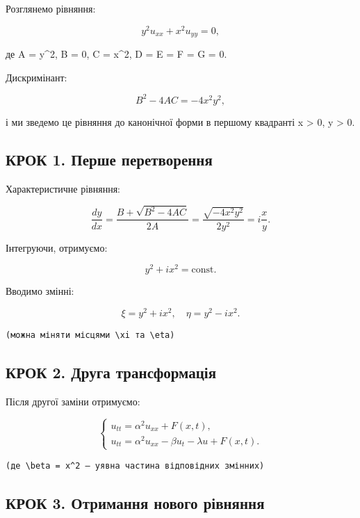 \documentclass[
  ukrainian,
]{article}
\begin{document}
Розглянемо рівняння:

\[
y^2 u_{xx} + x^2 u_{yy} = 0,
\]

де A = y\^{}2, B = 0, C = x\^{}2, D = E = F = G = 0.

Дискримінант:

\[
B^2 - 4AC = -4x^2 y^2,
\]

і ми зведемо це рівняння до канонічної форми в першому квадранті x
\textgreater{} 0, y \textgreater{} 0.

\subsection{КРОК 1. Перше
перетворення}\label{ux43aux440ux43eux43a-1.-ux43fux435ux440ux448ux435-ux43fux435ux440ux435ux442ux432ux43eux440ux435ux43dux43dux44f}

Характеристичне рівняння:

\[
\frac{dy}{dx} = \frac{B + \sqrt{B^2 - 4AC}}{2A} = \frac{\sqrt{-4x^2 y^2}}{2y^2} = i \frac{x}{y}.
\]

Інтегруючи, отримуємо:

\[
y^2 + i x^2 = \text{const}.
\]

Вводимо змінні:

\[
\xi = y^2 + i x^2, \quad \eta = y^2 - i x^2.
\]

\begin{verbatim}
(можна міняти місцями \xi та \eta)
\end{verbatim}

\subsection{КРОК 2. Друга
трансформація}\label{ux43aux440ux43eux43a-2.-ux434ux440ux443ux433ux430-ux442ux440ux430ux43dux441ux444ux43eux440ux43cux430ux446ux456ux44f}

Після другої заміни отримуємо:

\[
\begin{cases}
u_{tt} = \alpha^2 u_{xx} + F(x,t), \\
u_{tt} = \alpha^2 u_{xx} - \beta u_t - \lambda u + F(x,t).
\end{cases}
\]

\begin{verbatim}
(де \beta = x^2 — уявна частина відповідних змінних)
\end{verbatim}

\subsection{КРОК 3. Отримання нового
рівняння}\label{ux43aux440ux43eux43a-3.-ux43eux442ux440ux438ux43cux430ux43dux43dux44f-ux43dux43eux432ux43eux433ux43e-ux440ux456ux432ux43dux44fux43dux43dux44f}
\end{document}
